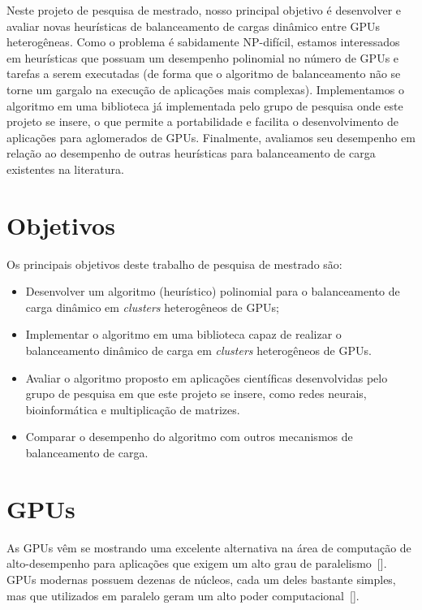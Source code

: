 Neste projeto de pesquisa de mestrado, nosso principal objetivo é desenvolver e
avaliar novas heurísticas de balanceamento de cargas dinâmico entre GPUs
heterogêneas. Como o problema é sabidamente NP-difícil, estamos interessados em
heurísticas que possuam um desempenho polinomial no número de GPUs e tarefas a
serem executadas (de forma que o algoritmo de balanceamento não se torne um
gargalo na execução de aplicações mais complexas). Implementamos o algoritmo
em uma biblioteca já implementada pelo grupo de pesquisa onde este projeto se
insere, o que permite a portabilidade e facilita o desenvolvimento de
aplicações para aglomerados de GPUs. Finalmente, avaliamos seu desempenho em
relação ao desempenho de outras heurísticas para balanceamento de carga
existentes na literatura.



\section{Objetivos}

Os principais objetivos deste trabalho de pesquisa de mestrado são:

\begin{itemize}
	\item Desenvolver um algoritmo (heurístico) polinomial para o balanceamento de carga dinâmico em
          \textit{clusters} heterogêneos de GPUs;
	\item Implementar o algoritmo em uma biblioteca capaz de realizar o
          balanceamento dinâmico de carga em \emph{clusters} heterogêneos de
          GPUs.
	\item Avaliar o algoritmo proposto em aplicações científicas
          desenvolvidas pelo grupo de pesquisa em que este projeto se insere,
          como redes neurais, bioinformática e multiplicação de matrizes.
	\item Comparar o desempenho do algoritmo com outros mecanismos de
          balanceamento de carga.
\end{itemize}



\section{GPUs}\label{intro:historico}

As GPUs vêm se mostrando uma excelente alternativa na área de computação de alto-desempenho para aplicações que exigem um alto grau de paralelismo~[\cite{gpu}]. GPUs modernas possuem dezenas de núcleos, cada um deles bastante simples, mas que utilizados em paralelo geram um alto poder computacional~[\cite{cuda}].


